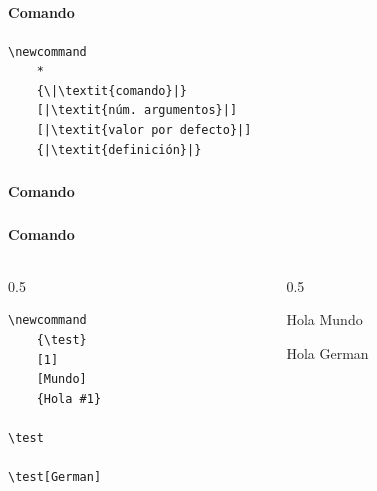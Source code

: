 \documentclass[12pt,aspectratio=169,ignorenonframetext]{ltxbeamer}
\begin{document}
\subsection{{\lmr\LaTeXe}}

\begin{frame}[fragile]
\frametitle{{\lmr\LaTeXe}}
\framesubtitle{Comando}

\begin{verbatim}
\newcommand
    *
    {\|\textit{comando}|}
    [|\textit{núm. argumentos}|]
    [|\textit{valor por defecto}|]
    {|\textit{definición}|}
\end{verbatim}
\end{frame}





\begin{frame}[fragile]
\frametitle{{\lmr\LaTeXe}}
\framesubtitle{Comando}

\end{frame}





\begin{frame}[fragile]
\frametitle{{\lmr\LaTeXe}}
\framesubtitle{Comando}

\begin{columns}
    \begin{column}{0.5\textwidth}
        \begin{verbatim}
\newcommand
    {\test}
    [1]
    [Mundo]
    {Hola #1}

\test

\test[German]
        \end{verbatim}
    \end{column}
    {\color{gray} \vline}
    \begin{column}{0.5\linewidth}
        \lmr
        \newcommand{\test}[1][Mundo]{Hola #1}

        \test

        \test[German]
    \end{column}
\end{columns}
\end{frame}
\end{document}
